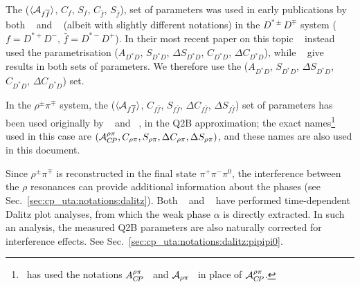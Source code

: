 The ($\Adirnoncp$, $C_f$, $S_f$, $C_{\bar{f}}$, $S_{\bar{f}}$),
set of parameters was used in early publications by both \babar~\cite{Aubert:2007pa} and \belle~\cite{Aushev:2004uc} (albeit with slightly different notations) in the $D^{*\pm}D^{\mp}$ system ($f = D^{*+}D^-$, $\bar{f} = D^{*-}D^+$).
In their most recent paper on this topic \belle~\cite{Rohrken:2012ta} instead used the parametrisation ($A_{D^*D}$, $S_{D^*D}$, $\Delta S_{D^*D}$, $C_{D^*D}$, $\Delta C_{D^*D}$), while \babar~\cite{Aubert:2008ah} give results in both sets of parameters.
We therefore use the ($A_{D^*D}$, $S_{D^*D}$, $\Delta S_{D^*D}$, $C_{D^*D}$, $\Delta C_{D^*D}$) set.

\mysubsubsubsection{$\Bz \to \rho^{\pm}\pi^\mp$
}
\label{sec:cp_uta:notations:non_cp:rhopi}

In the $\rho^\pm\pi^\mp$ system, the 
($\Adirnoncp$, $C_{f\bar{f}}$, $S_{f\bar{f}}$, $\Delta C_{f\bar{f}}$, 
$\Delta S_{f\bar{f}}$)
set of parameters has been used 
originally by \babar~\cite{Aubert:2003wr} and \belle~\cite{Wang:2004va}, 
in the Q2B approximation; 
the exact names\footnote{
  \babar\ has used the notations
  $A_{C\!P}^{\rho\pi}$~\cite{Aubert:2003wr} and 
  ${\cal A}_{\rho\pi}$~\cite{Aubert:2007jn}
  in place of ${\cal A}_{C\!P}^{\rho\pi}$.
}
used in this case are
$\left( 
  {\cal A}_{C\!P}^{\rho\pi}, C_{\rho\pi}, S_{\rho\pi}, \Delta C_{\rho\pi}, \Delta S_{\rho\pi}
\right)$,
and these names are also used in this document.

Since $\rho^\pm\pi^\mp$ is reconstructed in the final state $\pi^+\pi^-\pi^0$,
the interference between the $\rho$ resonances
can provide additional information about the phases 
(see Sec.~\ref{sec:cp_uta:notations:dalitz}).
Both \babar~\cite{Aubert:2007jn} 
and \belle~\cite{Kusaka:2007dv,:2007mj}
have performed time-dependent Dalitz plot analyses, 
from which the weak phase $\alpha$ is directly extracted.
In such an analysis, the measured Q2B parameters are 
also naturally corrected for interference effects.
See Sec.~\ref{sec:cp_uta:notations:dalitz:pipipi0}.

\label{sec:cp_uta:notations:non_cp:dstarpi}

